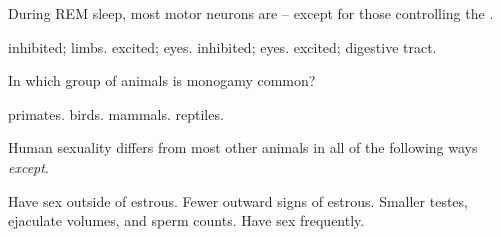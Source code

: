 \documentclass[answers]{exam}
\begin{document}
\begin{questions}
\question During REM sleep, most motor neurons are \fillin -- except for those controlling the \fillin.
\begin{choices}
\choice inhibited; limbs.
\choice excited; eyes.
\correctchoice inhibited; eyes.
\choice excited; digestive tract.
\end{choices}

\question In which group of animals is monogamy common?
\begin{choices}
\choice primates.
\correctchoice birds.
\choice mammals.
\choice reptiles.
\end{choices}

\newpage

\question Human sexuality differs from most other animals in all of the following ways \emph{except}.
\begin{choices}
\choice Have sex outside of estrous.
\choice Fewer outward signs of estrous.
\correctchoice Smaller testes, ejaculate volumes, and sperm counts.
\choice Have sex frequently.
\end{choices}






\end{questions}
\end{document}
